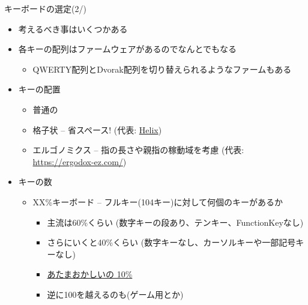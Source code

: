 \documentclass[cjk,dvipdfmx,10pt,compress,fragile%
hyperref={bookmarks=true,bookmarksnumbered=true,bookmarksopen=false,%
colorlinks=false,%
pdftitle={第 134 回 関西 Debian 勉強会},%
pdfauthor={小林},%
pdfsubject={資料},%
}]{beamer}
\begin{document}
\begin{frame}[fragile,t]{キーボードの選定(2/)}
 \begin{itemize}
  \item 考えるべき事はいくつかある
  \item 各キーの配列はファームウェアがあるのでなんとでもなる
	\begin{itemize}
	 \item QWERTY配列とDvorak配列を切り替えられるようなファームもある
	\end{itemize}
  \item キーの配置
	\begin{itemize}
	 \item 普通の
	 \item 格子状 -- 省スペース! (代表: \href{https://yushakobo.jp/shop/helix-keyboard-kit/}{Helix})
	 \item エルゴノミクス -- 指の長さや親指の稼動域を考慮 (代表: \href{ErgoDox}{https://ergodox-ez.com/})
	\end{itemize}
  \item キーの数
	\begin{itemize}
	 \item XX\%キーボード -- フルキー(104キー)に対して何個のキーがあるか
	       \begin{itemize}
		\item 主流は60\%くらい (数字キーの段あり、テンキー、FunctionKeyなし)
		\item さらにいくと40\%くらい (数字キーなし、カーソルキーや一部記号キーなし)
		\item \href{https://www.reddit.com/r/MechanicalKeyboards/comments/dnrvz8/science_isnt_about_why_its_about_why_not/}{あたまおかしいの 10\%}
		\item 逆に100を越えるのも(ゲーム用とか)
	       \end{itemize}
	\end{itemize}
 \end{itemize}
\end{frame}
\end{document}
